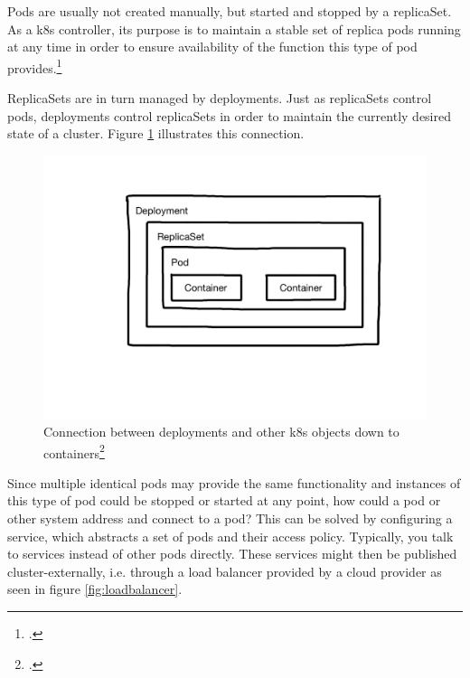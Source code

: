 Pods are usually not created manually, but started and stopped by a replicaSet. As a \gls{k8s} controller, its purpose is to maintain a stable set of replica pods running at any time in order to ensure availability of the function this type of pod provides.\footcite[][, introductory sentence]{k8sReplicaSets}

ReplicaSets are in turn managed by deployments. Just as replicaSets control pods, deployments control replicaSets in order to maintain the currently desired state of a cluster.
Figure \ref{fig:k8s-deployments} illustrates this connection.

\begin{figure}
\includegraphics[scale=0.2]{pictures/deployment.JPG} 
\caption{Connection between deployments and other \gls{k8s} objects down to containers\protect\footcite{nicoPictures}}
\label{fig:k8s-deployments}
\end{figure}

Since multiple identical pods may provide the same functionality and instances of this type of pod could be stopped or started at any point, how could a pod or other system address and connect to a pod? This can be solved by configuring a service, which abstracts a set of pods and their access policy. Typically, you talk to services instead of other pods directly. These services might then be published cluster-externally, i.e. through a load balancer provided by a cloud provider as seen in figure \ref{fig:loadbalancer}.

